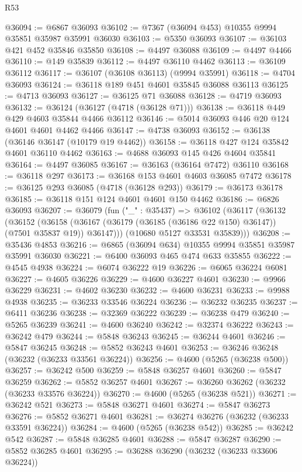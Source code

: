 \begin{lexlean}{R53}
\begin{coremodule}
@36094 := @6867 @36093
@36102 := @7367 (@36094 @453) @10355 @9994 @35851 @35987 @35991 @36030
@36103 := @5350 @36093
@36107 := @36103 @421 @452 @35846 @35850
@36108 := @4497 @36088
@36109 := @4497 @4466
@36110 := @149 @35839
@36112 := @4497 @36110 @4462
@36113 := @36109 @36112
@36117 := @36107 (@36108 @36113) (@9994 @35991)
@36118 := @4704 @36093
@36124 := @36118 @189 @451 @4601 @35845 @36088 @36113
@36125 := @4713 @36093
@36127 := @36125 @71 @36088
@36128 := @4719 @36093
@36132 := @36124 (@36127 (@4718 (@36128 @71)))
@36138 := @36118 @449 @429 @4603 @35844 @4466 @36112
@36146 := @5014 @36093 @446 @20 @124 @4601 @4601 @4462 @4466
@36147 := @4738 @36093
@36152 := @36138 (@36146 @36147 (@10179 @19 @4462))
@36158 := @36118 @427 @124 @35842 @4601 @36110 @4462
@36163 := @4688 @36093 @145 @426 @4604 @35841
@36164 := @4497 @36085
@36167 := @36163 (@36164 @7472) @36110
@36168 := @36118 @297
@36173 := @36168 @153 @4601 @4603 @36085 @7472
@36178 := @36125 @293 @36085 (@4718 (@36128 @293))
@36179 := @36173 @36178
@36185 := @36118 @151 @124 @4601 @4601 @150 @4462
@36186 := @6826 @36093
@36207 := @36079
    (fun ("_" : @35437) =>
    @36102
      (@36117
        (@36132
          (@36152
            (@36158 (@36167 (@36179 (@36185 (@36186 @22 @150) @36147)) (@7501 @35837 @19)) @36147)))
        (@10680 @5127 @33531 @35839)))
@36208 := @35436 @4853
@36216 := @6865 (@36094 @634) @10355 @9994 @35851 @35987 @35991 @36030
@36221 := @6400 @36093 @465 @474 @633 @35855
@36222 := @4545 @4938
@36224 := @6074 @36222 @19
@36226 := @6065 @36224 @6081
@36227 := @4605 @36226
@36229 := @4600 @36227 @4601
@36230 := @9966 @36229
@36231 := @4602 @36230
@36232 := @4600 @36231
@36233 := @9988 @4938
@36235 := @36233 @33546 @36224
@36236 := @36232 @36235
@36237 := @6411 @36236
@36238 := @32369 @36222
@36239 := @36238 @479
@36240 := @5265 @36239
@36241 := @4600 @36240
@36242 := @32374 @36222
@36243 := @36242 @479
@36244 := @5848 @36243
@36245 := @36244 @4601
@36246 := @5847 @36245
@36248 := @5852 @36243 @4601
@36253 := @36246 @36248 (@36232 (@36233 @33561 @36224))
@36256 := @4600 (@5265 (@36238 @500))
@36257 := @36242 @500
@36259 := @5848 @36257 @4601
@36260 := @5847 @36259
@36262 := @5852 @36257 @4601
@36267 := @36260 @36262 (@36232 (@36233 @33576 @36224))
@36270 := @4600 (@5265 (@36238 @521))
@36271 := @36242 @521
@36273 := @5848 @36271 @4601
@36274 := @5847 @36273
@36276 := @5852 @36271 @4601
@36281 := @36274 @36276 (@36232 (@36233 @33591 @36224))
@36284 := @4600 (@5265 (@36238 @542))
@36285 := @36242 @542
@36287 := @5848 @36285 @4601
@36288 := @5847 @36287
@36290 := @5852 @36285 @4601
@36295 := @36288 @36290 (@36232 (@36233 @33606 @36224))

\end{coremodule}
\end{lexlean}
